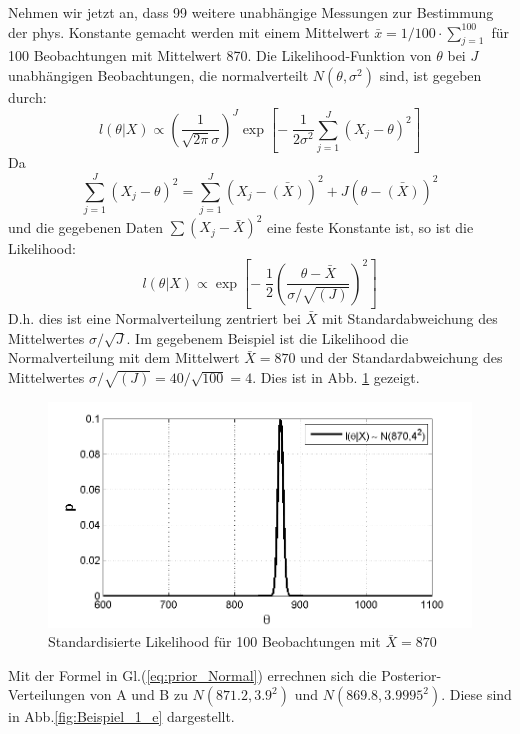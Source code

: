 Nehmen wir jetzt an, dass 99 weitere unabhängige Messungen zur Bestimmung der
phys. Konstante gemacht werden mit einem Mittelwert $\bar{x} = 1/100 \cdot \sum_{j=1}^{100}$ für 100 Beobachtungen mit Mittelwert 870. Die Likelihood-Funktion von $\theta$ bei $J$ unabhängigen Beobachtungen, die normalverteilt $N(\theta, \sigma^2)$ sind, ist gegeben durch:
\[
l(\theta|X) \propto \left( \frac{1}{\sqrt{2\pi}\sigma}\right)^J
\exp \left[-\; \frac{1}{2\sigma^2}\sum_{j=1}^{J}(X_j-\theta)^2\right]
\]
Da
\[
\sum_{j=1}^{J} (X_j-\theta)^2 = \sum_{j=1}^{J} (X_j-\bar{(X)})^2+J(\theta-\bar{(X)})^2
\]
und die gegebenen Daten $\sum(X_j-\bar{X})^2$ eine feste Konstante ist, so ist
die Likelihood:
\begin{equation}
l(\theta|X) \propto
\exp \left[-\; \frac{1}{2} \left(\frac{\theta-\bar{X}}{\sigma / \sqrt{(J)}}
\right)^2\right]
\label{eq:Likelihood_Stichprobenumfang_J}
\end{equation}
D.h. dies ist eine Normalverteilung zentriert bei $\bar{X}$ mit Standardabweichung des Mittelwertes
$\sigma / \sqrt{J}$.
Im gegebenem Beispiel ist die Likelihood die Normalverteilung mit dem Mittelwert
$\bar{X} = 870$ und der Standardabweichung des Mittelwertes $\sigma/\sqrt{(J)} = 40 / \sqrt{100} = 4$.
Dies ist in Abb. \ref{fig:Beispiel_1_d} gezeigt.

\begin{figure}[!h]
	\begin{center}
		\includegraphics[width=130mm]{12_vorlesung_GUMS2/media/likelihood_100_Beobachtung.png}
		\caption{Standardisierte Likelihood
		für 100 Beobachtungen mit $\bar{X} = 870$}
	    \label{fig:Beispiel_1_d}
	\end{center}
\end{figure}

Mit der Formel in Gl.(\ref{eq:prior_Normal}) errechnen sich die Posterior-Verteilungen
von A und B zu $N(871.2,3.9^2)$ und $N(869.8,3.9995^2)$.
Diese sind in Abb.\ref{fig:Beispiel_1_e} dargestellt.

